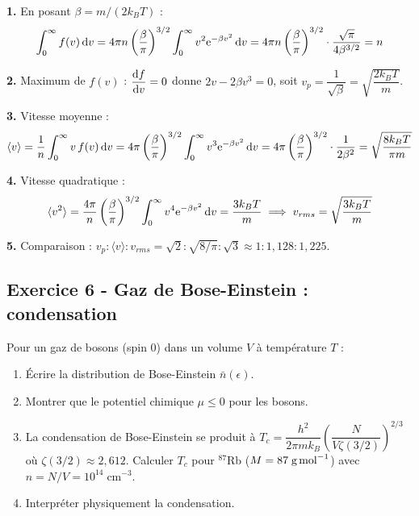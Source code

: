 \documentclass[12pt,a4paper]{article}
\begin{document}
\begin{boitecorrige}
\textbf{1.} En posant $\beta = m/(2k_BT)$ :
\[
\int_0^\infty f(v)\,\mathrm{d} v = 4\pi n\left(\frac{\beta}{\pi}\right)^{3/2}\int_0^\infty v^2\mathrm{e}^{-\beta v^2}\,\mathrm{d} v = 4\pi n\left(\frac{\beta}{\pi}\right)^{3/2}\cdot\frac{\sqrt{\pi}}{4\beta^{3/2}} = n
\]

\textbf{2.} Maximum de $f(v)$ : $\dfrac{\mathrm{d} f}{\mathrm{d} v} = 0$ donne $2v - 2\beta v^3 = 0$, soit $v_p = \dfrac{1}{\sqrt{\beta}} = \sqrt{\dfrac{2k_BT}{m}}$.

\textbf{3.} Vitesse moyenne :
\[
\langle v\rangle = \frac{1}{n}\int_0^\infty v\,f(v)\,\mathrm{d} v = 4\pi\left(\frac{\beta}{\pi}\right)^{3/2}\int_0^\infty v^3\mathrm{e}^{-\beta v^2}\,\mathrm{d} v = 4\pi\left(\frac{\beta}{\pi}\right)^{3/2}\cdot\frac{1}{2\beta^2} = \sqrt{\frac{8k_BT}{\pi m}}
\]

\textbf{4.} Vitesse quadratique :
\[
\langle v^2\rangle = \frac{4\pi}{n}\left(\frac{\beta}{\pi}\right)^{3/2}\int_0^\infty v^4\mathrm{e}^{-\beta v^2}\,\mathrm{d} v = \frac{3k_BT}{m} \implies v_{rms} = \sqrt{\frac{3k_BT}{m}}
\]

\textbf{5.} Comparaison : $v_p : \langle v\rangle : v_{rms} = \sqrt{2} : \sqrt{8/\pi} : \sqrt{3} \approx 1 : 1{,}128 : 1{,}225$.
\end{boitecorrige}

\subsection*{Exercice 6 - Gaz de Bose-Einstein : condensation \niveau{\difficile}}

\begin{boiteexercice}
Pour un gaz de bosons (spin 0) dans un volume $V$ à température $T$ :
\begin{enumerate}
  \item Écrire la distribution de Bose-Einstein $\bar{n}(\epsilon)$.
  \item Montrer que le potentiel chimique $\mu \leq 0$ pour les bosons.
  \item La condensation de Bose-Einstein se produit à $T_c = \dfrac{h^2}{2\pi m k_B}\left(\dfrac{N}{V\zeta(3/2)}\right)^{2/3}$ où $\zeta(3/2) \approx 2{,}612$. Calculer $T_c$ pour ${}^{87}$Rb ($M = 87\;\text{g\,mol}^{-1}$) avec $n = N/V = 10^{14}\;\text{cm}^{-3}$.
  \item Interpréter physiquement la condensation.
\end{enumerate}
\end{boiteexercice}
\end{document}
